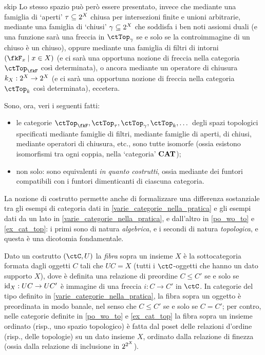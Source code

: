 \begin{hDigression}{skip}
	Lo stesso spazio può però essere presentato, invece che mediante una famiglia di `aperti' \(\tau \subseteq 2^{X}\) chiusa per intersezioni finite e unioni arbitrarie, mediante una famiglia di `chiusi' \(\gamma\subseteq 2^{X}\) che soddisfa i ben noti assiomi duali (e una funzione sarà una freccia in \(\ctTop_\gamma\) se e solo se la controimmagine di un chiuso è un chiuso), oppure mediante una famiglia di filtri di intorni \((\fkF_x \mid x\in X)\) (e ci sarà una opportuna nozione di freccia nella categoria \(\ctTop_\fkF\) così determinata), o ancora mediante un operatore di chiusura \(k_X : 2^{X}\to 2^{X}\) (e ci sarà una opportuna nozione di freccia nella categoria \(\ctTop_k\) così determinata), eccetera.

	Sono, ora, veri i seguenti fatti:
	\begin{itemize}
		\item le categorie \(\ctTop_\fkF,\ctTop_\tau,\ctTop_\gamma,\ctTop_k,\dots\) degli spazi topologici specificati mediante famiglie di filtri, mediante famiglie di aperti, di chiusi, mediante operatori di chiusura, etc., sono tutte isomorfe (ossia esistono isomorfismi tra ogni coppia, nella `categoria' \(\mathbf{CAT}\));
		\item non solo: sono equivalenti \emph{in quanto costrutti}, ossia mediante dei funtori compatibili con i funtori dimenticanti di ciascuna categoria.
	\end{itemize}
	La nozione di costrutto permette anche di formalizzare una differenza sostanziale tra gli esempi di categoria dati in \ref{varie_categorie_nella_pratica} e gli esempi dati da un lato in \ref{varie_categorie_nella_pratica}, e dall'altro in \ref{po_wo_to} e \ref{ex_cat_top}: i primi sono di natura \emph{algebrica}, e i secondi di natura \emph{topologica}, e questa è una dicotomia fondamentale.

	Dato un costrutto \((\ctC,U)\) la \emph{fibra} sopra un insieme \(X\) è la sottocategoria formata dagli oggetti \(C\) tali che \(UC=X\) (tutti i \(\ctC\)-oggetti che hanno un dato supporto \(X\)), dove è definita una relazione di preordine \(C\le C'\) se e solo se \(\mathrm{id}_X : UC \to UC'\) è immagine di una freccia \(i : C\to C'\) in \(\ctC\). In categorie del tipo definito in \ref{varie_categorie_nella_pratica}, la fibra sopra un oggetto è preordinata in modo banale, nel senso che \(C\le C'\) se e solo se \(C=C'\); per contro, nelle categorie definite in \ref{po_wo_to} e \ref{ex_cat_top} la fibra sopra un insieme ordinato (risp., uno spazio topologico) è fatta dal poset delle relazioni d'ordine (risp., delle topologie) su un dato insieme \(X\), ordinato dalla relazione di finezza (ossia dalla relazione di inclusione in \(2^{2^{X}}\)).
\end{hDigression}
